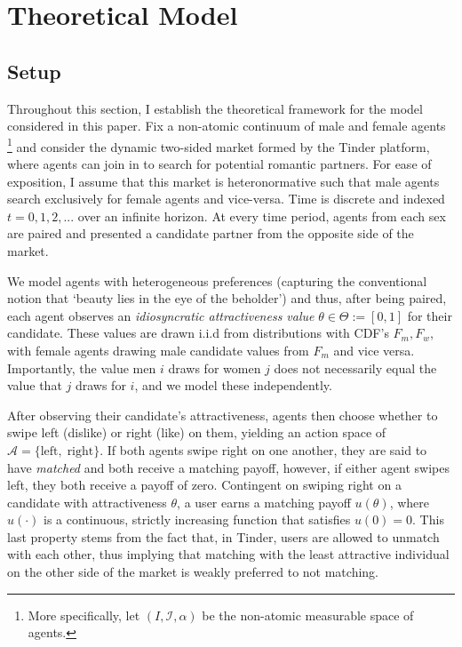 \section{Theoretical Model}
\label{sec:section2}
\subsection{Setup}\label{sec:section2.1} 
Throughout this section, I establish the theoretical framework for the model considered in this paper. Fix a non-atomic continuum of male and female agents \footnote{More specifically, let  $(I, \mathcal{I}, \alpha)$ be the non-atomic measurable space of agents.} and consider the dynamic two-sided market formed by the Tinder platform, where agents can join in to search for potential romantic partners. 
For ease of exposition, I assume that this market is heteronormative such that male agents search exclusively for female agents and vice-versa. 
Time is discrete and indexed $t=0, 1, 2, ...$ over an infinite horizon. 
At every time period, agents from each sex are paired and presented a candidate partner from the opposite side of the market. 
\begin{comment}
    Each agent has an attractiveness type $\theta \in \Theta := [0,1]$ which is unknown to them but observable to their candidate, and it is common knowledge that this is the case.
\end{comment}
We model agents with heterogeneous preferences (capturing the conventional notion that `beauty lies in the eye of the beholder') and thus, after being paired, each agent observes an \textit{idiosyncratic attractiveness value} $\theta \in \Theta := [0,1]$ for their candidate. These values are drawn i.i.d from distributions with CDF's $F_m, F_w$, with female agents drawing male candidate values from $F_m$ and vice versa. Importantly, the value men $i$ draws for women $j$ does not necessarily equal the value that $j$ draws for $i$, and we model these independently.

After observing their candidate's attractiveness, agents then choose whether to swipe left (dislike) or right (like) on them, yielding an action space of $\mathcal{A}=\{ \text{left},\; \text{right}\}$. 
If both agents swipe right on one another, they are said to have \textit{matched} and both receive a matching payoff, however, if either agent swipes left, they both receive a payoff of zero. Contingent on swiping right on a candidate with attractiveness $\theta$, a user earns a matching payoff $u(\theta)$, where $u(\cdot)$ is a continuous, strictly increasing function that satisfies $u(0) = 0$. 
This last property stems from the fact that, in Tinder, users are allowed to unmatch with each other, thus implying that matching with the least attractive individual on the other side of the market is weakly preferred to not matching. 

